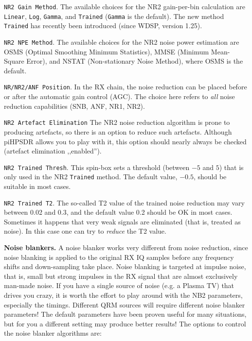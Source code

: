 \documentclass[12pt]{book}
\def\rett#1{\texttt{\color{red}#1}}
\def\pH{pi\-HPSDR\xspace}
\begin{document}
\rett{NR2 Gain Method}. The available choices for the NR2 gain-per-bin calculation
 are \rett{Linear},
 \rett{Log}, \rett{Gamma}, and \rett{Trained} (\rett{Gamma} is the default). The new method
 \rett{Trained} has recently been introduced (since WDSP, version 1.25).

\rett{NR2 NPE Method}. The available choices for the NR2 noise power estimation
are OSMS
(Optimal Smoothing Minimum Statistics), MMSE (Minimum Mean-Square Error), and
NSTAT (Non-stationary Noise Method),
where OSMS is the default.

\rett{NR/NR2/ANF Position}. In the RX chain, the noise reduction can be placed before or after
the automatic gain control (AGC). The choice here refers to \textit{all} noise reduction
capabilities (SNB, ANF, NR1, NR2).

\rett{NR2 Artefact Elimination} The NR2 noise reduction algorithm is prone to producing
artefacts, so there is an option to reduce such artefacts.
Although \pH allows you to play with it, this option should nearly always be
checked (artefact elimination ,,enabled'').

\rett{NR2 Trained Thresh}. This spin-box sets a threshold (between $-5$ and $5$)
that is only used in the NR2 \rett{Trained} method. The default value, $-0.5$, should be
suitable in most cases.

\rett{NR2 Trained T2}. The so-called T2 value of the trained noise reduction may vary between
0.02 and 0.3, and the default value 0.2 should be OK in most cases. Sometimes it happens that
very weak signals are eliminated (that is, treated as noise). In this case one can try to \textit{reduce} the
T2 value.


\textbf{Noise blankers.} A noise blanker works very different from  noise reduction, since noise blanking
is applied to the original RX IQ samples before any frequency shifts and down-sampling take place.
Noise blanking is targeted at impulse noise, that is, small but strong impulses in the RX
signal that are almost exclusively man-made noise.
If you have a single source of noise (e.g. a Plasma TV) that drives you crazy, it is worth
the effort to play around with the NB2 parameters, especially the timings. Different
QRM sources will require different noise blanker parameters! The default parameters have been proven useful
for many situations, but for you a different setting may produce better results!
The options to control the noise blanker algorithms are:
\end{document}

